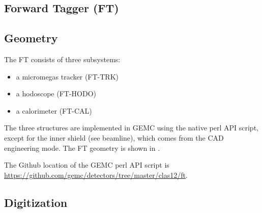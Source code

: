 \subsection{Forward Tagger (FT)}


\subsection{Geometry}

The FT consists of three subsystems:

\begin{itemize}
	\item a micromegas tracker (FT-TRK)
	\item a hodoscope (FT-HODO)
 	\item a calorimeter (FT-CAL)
\end{itemize}

The three structures are implemented in GEMC using the native perl API script, except for the inner shield (see beamline),
which comes from the CAD engineering mode.
The FT geometry is shown in .

The Github location of the GEMC perl API script is \url{https://github.com/gemc/detectors/tree/master/clas12/ft}.


\subsection{Digitization}

